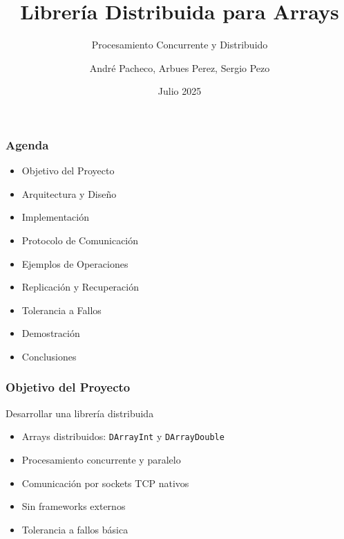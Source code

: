 \documentclass{beamer}
\title{Librería Distribuida para Arrays}
\subtitle{Procesamiento Concurrente y Distribuido}
\author{André Pacheco, Arbues Perez, Sergio Pezo}
\date{Julio 2025}
\begin{document}
\maketitle

\begin{frame}
\frametitle{Agenda}
\begin{itemize}
    \item Objetivo del Proyecto
    \item Arquitectura y Diseño
    \item Implementación
    \item Protocolo de Comunicación
    \item Ejemplos de Operaciones
    \item Replicación y Recuperación
    \item Tolerancia a Fallos
    \item Demostración
    \item Conclusiones
\end{itemize}
\end{frame}

\begin{frame}
\frametitle{Objetivo del Proyecto}
\begin{block}{Desarrollar una librería distribuida}
    \begin{itemize}
        \item<1-> Arrays distribuidos: \texttt{DArrayInt} y \texttt{DArrayDouble}
        \item<2-> Procesamiento concurrente y paralelo
        \item<3-> Comunicación por sockets TCP nativos
        \item<4-> Sin frameworks externos
        \item<5-> Tolerancia a fallos básica
    \end{itemize}
\end{block}

\end{frame}
\end{document}
